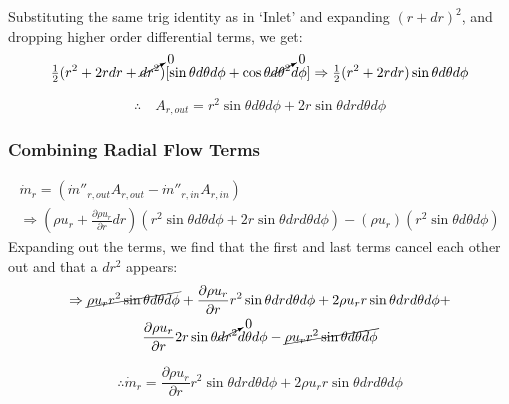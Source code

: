 \documentclass[12pt, letterpaper, twoside]{article}
\begin{document}
            Substituting the same trig identity as in `Inlet' and expanding \((r + dr)^2\), and dropping higher order differential terms, we get:
            \begin{equation*}
                \tfrac{1}{2} (r^2 + 2rdr + \cancelto{0}{dr^2}) [\sin\theta d\theta d\phi + \cos\theta \cancelto{0}{d\theta^2} d\phi]
                \Rightarrow \tfrac{1}{2} (r^2 + 2rdr) \sin\theta d\theta d\phi
            \end{equation*}

            \begin{equation}
                \therefore\quad A_{r,out} = r^2 \sin\theta d\theta d\phi + 
                2r\sin\theta drd\theta d\phi
                \label{eq:Arout_final}
            \end{equation}

        \subsubsection{Combining Radial Flow Terms}
            \begin{multline*}
                \dot{m}_r = (\dot{m}''_{r,out} A_{r,out} - \dot{m}''_{r,in} A_{r,in}) 
                \\\Rightarrow
                \left(\rho u_r  + \frac{\partial \rho u_r}{\partial r} dr\right)\left(r^2 \sin\theta d\theta d\phi + 2r\sin\theta dr d\theta d\phi\right) -
                \left(\rho u_r\right)\left(r^2 \sin\theta d\theta d\phi\right)
            \end{multline*}
            Expanding out the terms, we find that the first and last terms cancel each other out and that a \(dr^2\) appears:
            \begin{multline*}
                \Rightarrow
                \cancel{\rho u_r r^2 \sin\theta d\theta d\phi} +
                \frac{\partial \rho u_r}{\partial r} r^2 \sin\theta dr d\theta d\phi +
                2\rho u_r r\sin\theta dr d\theta d\phi + \\
                \frac{\partial \rho u_r}{\partial r} 2r\sin\theta \cancelto{0}{dr^2} d\theta d\phi - 
                \cancel{\rho u_r r^2 \sin\theta d\theta d\phi}
            \end{multline*}

            \begin{equation}\label{eq:mdotr}
                \therefore
                \dot{m}_r = \frac{\partial \rho u_r}{\partial r} r^2 \sin\theta dr d\theta d\phi +
                2\rho u_r r\sin\theta dr d\theta d\phi
            \end{equation}
\end{document}
